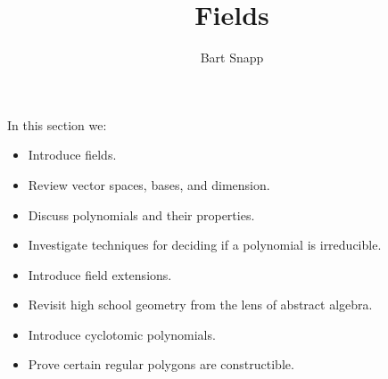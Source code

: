 \documentclass{ximera}
\author{Bart Snapp}
\title{Fields}
\begin{document}
\begin{abstract}
\end{abstract}
\maketitle
In this section we:

\begin{itemize}
\item Introduce fields.
\item Review vector spaces, bases, and dimension.
\item Discuss polynomials and their properties.
\item Investigate techniques for deciding if a polynomial is
  irreducible.
\item Introduce field extensions.
\item Revisit high school geometry from the lens of abstract algebra.
\item Introduce cyclotomic polynomials.
\item Prove certain regular polygons are constructible.
\end{itemize}
\end{document}
